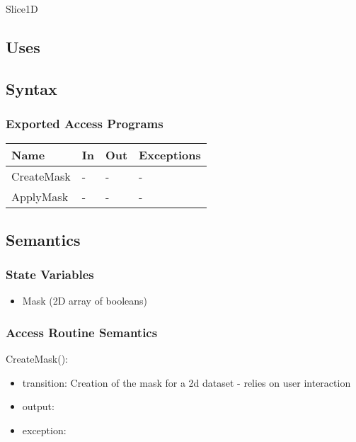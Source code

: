 \documentclass[12pt, titlepage]{article}
\begin{document}
Slice1D

\subsection{Uses}


\subsection{Syntax}

\subsubsection{Exported Access Programs}

\begin{center}
\begin{tabular}{p{2cm} p{4cm} p{4cm} p{2cm}}
\hline
\textbf{Name} & \textbf{In} & \textbf{Out} & \textbf{Exceptions} \\
\hline
CreateMask & - & - & - \\
ApplyMask & - & - & - \\
\hline
\end{tabular}
\end{center}

\subsection{Semantics}

\subsubsection{State Variables}
\begin{itemize}
\item Mask (2D array of booleans)
\end{itemize}

\subsubsection{Access Routine Semantics}

\noindent CreateMask():
\begin{itemize}
\item transition: Creation of the mask for a 2d dataset - relies on user interaction
\item output:  
\item exception:  
\end{itemize}
\end{document}

